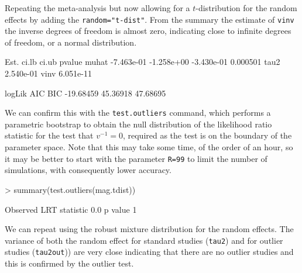 \documentclass{article}
\begin{document}
Repeating the meta-analysis but now allowing for a $t$-distribution for the random effects by adding the \texttt{random="t-dist"}. From the summary the estimate of \texttt{vinv} the inverse degrees of freedom is almost zero, indicating close to infinite degrees of freedom, or a normal distribution.
\begin{Schunk}
\begin{Soutput}
            Est.      ci.lb      ci.ub   pvalue
muhat -7.463e-01 -1.258e+00 -3.430e-01 0.000501
tau2   2.540e-01                               
vinv   6.051e-11                               

     logLik      AIC      BIC
  -19.68459 45.36918 47.68695
\end{Soutput}
\end{Schunk}

We can confirm this with the \texttt{test.outliers} command, which performs a parametric bootstrap to obtain the null distribution of the likelihood ratio statistic for the test that $v^{-1}=0$, required as the test is on the boundary of the parameter space. Note that this may take some time, of the order of an hour, so it may be better to start with the parameter \texttt{R=99} to limit the number of simulations, with consequently lower accuracy.
\begin{Schunk}
\begin{Sinput}
> summary(test.outliers(mag.tdist))
\end{Sinput}
\begin{Soutput}
Observed LRT statistic 0.0 p value 1
\end{Soutput}
\end{Schunk}

We can repeat using the robust mixture distribution for the random effects. The variance of both the random effect for standard studies (\texttt{tau2}) and for outlier studies (\texttt{tau2out})) are very close indicating that there are no outlier studies and this is confirmed by the outlier test.
\end{document}
